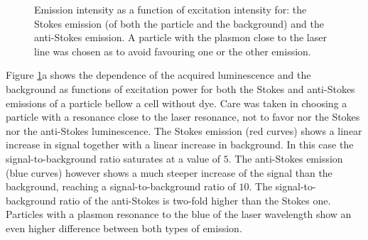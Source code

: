 \documentclass[journal=nalefd,manuscript=letter]{achemso}
\begin{document}
\begin{figure}[htp]
\centering
	\caption{Emission intensity as a function of excitation intensity for: the
	Stokes emission (of both the particle and the background) and the anti-Stokes
	emission. A particle with the plasmon close to the laser line was chosen as to
	avoid favouring one or the other emission.}
	\label{fig:power_intensity}
\end{figure}

Figure \ref{fig:power_intensity}a shows the dependence of the acquired
luminescence and the background as functions of excitation power for both the
Stokes and anti-Stokes emissions of a particle bellow a cell without dye. Care
was taken in choosing a particle with a resonance close to the laser resonance,
not to favor nor the Stokes nor the anti-Stokes luminescence. The Stokes
emission (red curves) shows a linear increase in signal together with a linear
increase in background. In this case the signal-to-background ratio saturates at
a value of $5$. The anti-Stokes emission (blue curves) however shows a much
steeper increase of the signal than the background, reaching a
signal-to-background ratio of $10$. The signal-to-background ratio of the
anti-Stokes is two-fold higher than the Stokes one. Particles with a plasmon
resonance to the blue of the laser wavelength show an even higher difference
between both types of emission.
\end{document}

